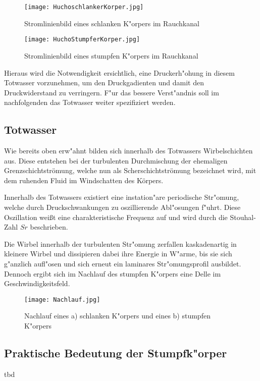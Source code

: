 \begin{figure}[h]
	\centering
	\texttt{[image: HuchoschlankerKorper.jpg]}
	\caption{Stromlinienbild eines schlanken K"orpers im Rauchkanal \cite{Hucho.2011}}
	\label{fig:HuchoSchlank}
\end{figure}

\begin{figure}[h]
	\centering
	\texttt{[image: HuchoStumpferKorper.jpg]}
	\caption{Stromlinienbild eines stumpfen K"orpers im Rauchkanal \cite{Hucho.2011}}
	\label{fig:HuchoStumpf}
\end{figure}


Hieraus wird die Notwendigkeit ersichtlich, eine Druckerh"ohung in diesem Totwasser vorzunehmen, um den Druckgadienten und damit den Druckwiderstand zu verringern. F"ur das bessere Verst"andnis soll im nachfolgenden das Totwasser weiter spezifiziert werden.

\subsection{Totwasser}
\label{sec:Totwasser}

Wie bereits oben erw"ahnt bilden sich innerhalb des Totwassers Wirbelschichten aus. Diese entstehen bei der turbulenten Durchmischung der ehemaligen Grenzschichtströmung, welche nun als Scherschichtströmung bezeichnet wird, mit dem ruhenden Fluid im Windschatten des Körpers. 



 
Innerhalb des Totwassers existiert eine instation"are periodische Str"omung, welche durch Druckschwankungen zu oszillierende Abl"osungen f"uhrt. Diese Oszillation wei\ss{}t eine charakteristische Frequenz auf und wird durch die Stouhal-Zahl ${Sr}$ beschrieben. 

Die Wirbel innerhalb der turbulenten Str"omung  zerfallen kaskadenartig in kleinere Wirbel und dissipieren dabei ihre Energie in W"arme, bis sie sich g"anzlich aufl"osen und sich erneut ein laminares Str"omungsprofil ausbildet. Dennoch ergibt sich im Nachlauf des stumpfen K"orpers eine Delle im Geschwindigkeitsfeld. 

\begin{figure}[h]
	\centering
	\texttt{[image: Nachlauf.jpg]}
	\caption{Nachlauf eines a) schlanken K"orpers und eines b) stumpfen K"orpers \cite{Hucho.2011}}
	\label{fig:Nachlauf}
\end{figure}

\subsection{Praktische Bedeutung der Stumpfk"orper}
tbd




